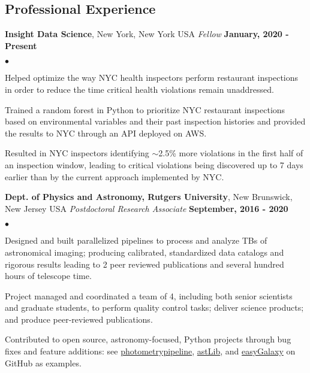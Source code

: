 \documentclass[margin,line, 11pt]{res}
\newenvironment{list2}{
  \begin{list}{$\bullet$}{%
      \setlength{\itemsep}{0in}
      \setlength{\parsep}{0in} \setlength{\parskip}{0in}
      \setlength{\topsep}{0in} \setlength{\partopsep}{0in}
      \setlength{\leftmargin}{0.2in}}}{\end{list}}
\begin{document}
\begin{resume}
\section{Professional \newline Experience}
\textbf{Insight Data Science}, New York, New York USA \newline
\textit{Fellow} \hfill \textbf{January, 2020 - Present}\newline
    \begin{list2}
    	\vspace*{-5mm}
      \item Helped optimize the way NYC health inspectors perform restaurant inspections in order to reduce the time critical health violations remain unaddressed.
    	\item Trained a random forest in Python to prioritize NYC restaurant inspections based on environmental variables and their past inspection histories and provided the results to NYC through an API deployed on AWS.
    	\item Resulted in NYC inspectors identifying $\sim$2.5\% more violations in the first half of an inspection window,  leading to critical violations being discovered up to 7 days earlier than by the current approach implemented by NYC.
    \end{list2}
\vspace*{-2mm}

\textbf{Dept. of Physics and Astronomy, Rutgers University}, New Brunswick, New Jersey USA \newline
\textit{Postdoctoral Research Associate} \hfill \textbf{September, 2016 - 2020}\newline
    \begin{list2}
    	\vspace*{-5mm}
    	\item Designed and built parallelized pipelines to process and analyze TBs of astronomical imaging; producing calibrated, standardized data catalogs and rigorous results leading to 2 peer reviewed publications and several hundred hours of telescope time.
    	\item Project managed and coordinated a team of 4, including both senior scientists and graduate students,
      to perform quality control tasks; deliver science products; and produce peer-reviewed publications.
    	\item Contributed to open source, astronomy-focused, Python projects through bug fixes and feature additions: see \href{https://github.com/boada/photometrypipeline}{photometrypipeline}, \href{http://astlib.sourceforge.net/}{astLib}, and \href{https://github.com/boada/easyGalaxy}{easyGalaxy} on GitHub as examples.
    \end{list2}
\vspace*{-2mm}


\end{resume}
\end{document}
